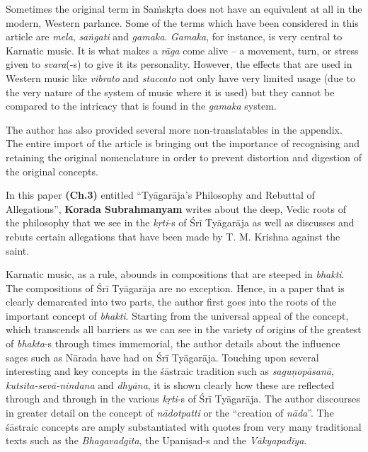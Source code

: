 Sometimes the original term in Saṁskṛta does not have an equivalent at all in the modern, Western parlance. Some of the terms which have been considered in this article are \textit{mela}, \textit{saṅgati} and \textit{gamaka}. \textit{Gamaka}, for instance, is very central to Karnatic music. It is what makes a \textit{rāga} come alive – a movement, turn, or stress given to \textit{svara}(-s) to give it its personality. However, the effects that are used in Western music like \textit{vibrato} and \textit{staccato} not only have very limited usage (due to the very nature of the system of music where it is used) but they cannot be compared to the intricacy that is found in the \textit{gamaka} system.

The author has also provided several more non-translatables in the appendix. The entire import of the article is bringing out the importance of recognising and retaining the original nomenclature in order to prevent distortion and digestion of the original concepts.

In this paper \textbf{(Ch.3)} entitled “Tyāgarāja’s Philosophy and Rebuttal of Allegations”, \textbf{Korada Subrahmanyam} writes about the deep, Vedic roots of the philosophy that we see in the \textit{kṛti}-s of Śrī Tyāgarāja as well as discusses and rebuts certain allegations that have been made by T. M. Krishna against the saint.

Karnatic music, as a rule, abounds in compositions that are steeped in \textit{bhakti}. The compositions of Śrī Tyāgarāja are no exception. Hence, in a paper that is clearly demarcated into two parts, the author first goes into the roots of the important concept of \textit{bhakti}. Starting from the universal appeal of the concept, which transcends all barriers as we can see in the variety of origins of the greatest of \textit{bhakta}-s through times immemorial, the author details about the influence sages such as Nārada have had on Śrī Tyāgarāja. Touching upon several interesting and key concepts in the śāstraic tradition such as \textit{saguṇopāsanā}, \textit{kutsita-sevā-nindana} and \textit{dhyāna}, it is shown clearly how these are reflected through and through in the various \textit{kṛti}-s of Śrī Tyāgarāja. The author discourses in greater detail on the concept of \textit{nādotpatti} or the “creation of \textit{nāda}”. The śāstraic concepts are amply substantiated with quotes from very many traditional texts such as the \textit{Bhagavadgīta}, the Upaniṣad-s and the \textit{Vākyapadīya}.

